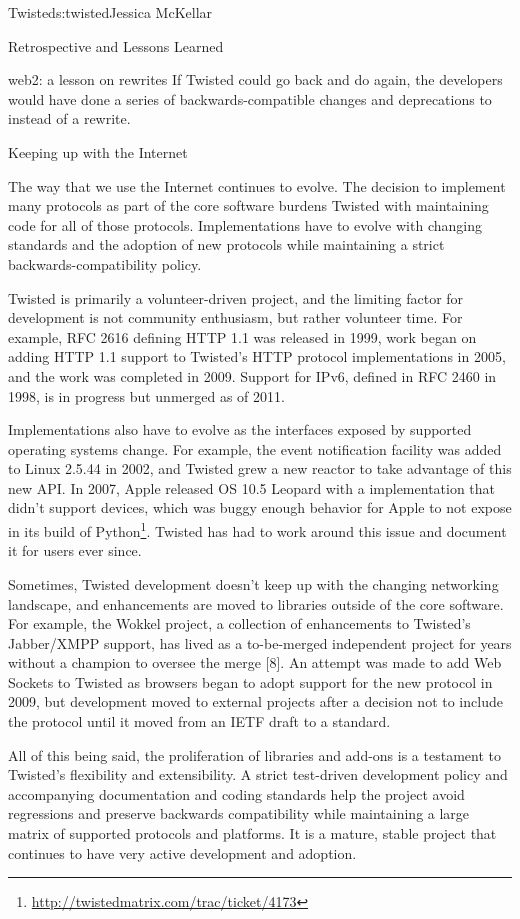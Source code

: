 \begin{aosachapter}{Twisted}{s:twisted}{Jessica McKellar}
\begin{aosasect1}{Retrospective and Lessons Learned}
\begin{aosasect2}{web2: a lesson on rewrites}
If Twisted could go back and do  again, the developers would
have done a series of backwards-compatible changes and deprecations to
 instead of a rewrite.

\end{aosasect2}

\begin{aosasect2}{Keeping up with the Internet}

The way that we use the Internet continues to evolve. The decision to
implement many protocols as part of the core software burdens Twisted with
maintaining code for all of those protocols.  Implementations have to evolve
with changing standards and the adoption of new protocols while maintaining a
strict backwards-compatibility policy.

Twisted is primarily a volunteer-driven project, and the limiting factor for
development is not community enthusiasm, but rather volunteer time. For example,
RFC 2616 defining HTTP 1.1 was released in 1999, work began on adding HTTP 1.1
support to Twisted's HTTP protocol implementations in 2005, and the work was
completed in 2009.  Support for IPv6, defined in RFC 2460 in 1998, is in
progress but unmerged as of 2011.

Implementations also have to evolve as the interfaces exposed by
supported operating systems change. For example, the 
event notification facility was added to Linux 2.5.44 in 2002, and
Twisted grew a new  reactor to take advantage of this new
API. In 2007, Apple released OS 10.5 Leopard with a 
implementation that didn't support devices, which was buggy enough
behavior for Apple to not expose  in its build of
Python\footnote{\url{http://twistedmatrix.com/trac/ticket/4173}}.
Twisted has had to work around this issue and document it for users
ever since.

Sometimes, Twisted development doesn't keep up with the changing networking
landscape, and enhancements are moved to libraries outside of the core
software. For example, the Wokkel project, a collection of enhancements to
Twisted's Jabber/XMPP support, has lived as a to-be-merged independent project
for years without a champion to oversee the merge [8]. An attempt was made to
add Web Sockets to Twisted as browsers began to adopt support for the new
protocol in 2009, but development moved to external projects after a decision
not to include the protocol until it moved from an IETF draft to a standard.

All of this being said, the proliferation of libraries and add-ons is a
testament to Twisted's flexibility and extensibility. A strict test-driven
development policy and accompanying documentation and coding standards help the
project avoid regressions and preserve backwards compatibility while maintaining
a large matrix of supported protocols and platforms. It is a mature, stable
project that continues to have very active development and adoption.


\end{aosasect2}
\end{aosasect1}
\end{aosachapter}

